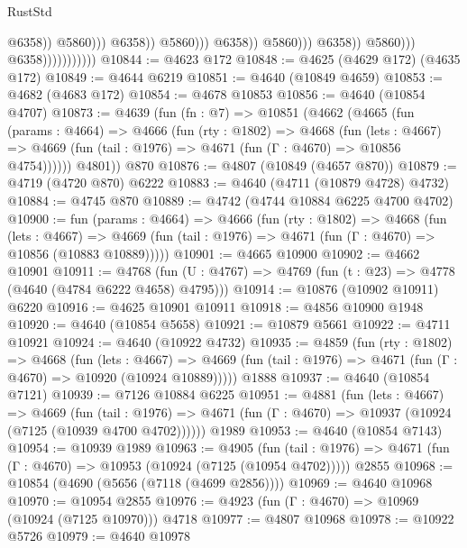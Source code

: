 \begin{lexlean}{RustStd}
\begin{coremodule}
                                                                  @6358))
                                                              @5860)))
                                                        @6358))
                                                    @5860)))
                                              @6358))
                                          @5860)))
                                    @6358))
                                @5860)))
                          @6358)))))))))))
@10844 := @4623 @172
@10848 := @4625 (@4629 @172) (@4635 @172)
@10849 := @4644 @6219
@10851 := @4640 (@10849 @4659)
@10853 := @4682 (@4683 @172)
@10854 := @4678 @10853
@10856 := @4640 (@10854 @4707)
@10873 := @4639
    (fun (fn : @7) =>
    @10851
      (@4662
        (@4665
          (fun (params : @4664) =>
          @4666
            (fun (rty : @1802) =>
            @4668
              (fun (lets : @4667) =>
              @4669 (fun (tail : @1976) => @4671 (fun (Γ : @4670) => @10856 @4754))))))
        @4801))
    @870
@10876 := @4807 (@10849 (@4657 @870))
@10879 := @4719 (@4720 @870) @6222
@10883 := @4640 (@4711 (@10879 @4728) @4732)
@10884 := @4745 @870
@10889 := @4742 (@4744 @10884 @6225 @4700 @4702)
@10900 := fun (params : @4664) =>
  @4666
    (fun (rty : @1802) =>
    @4668
      (fun (lets : @4667) =>
      @4669 (fun (tail : @1976) => @4671 (fun (Γ : @4670) => @10856 (@10883 @10889)))))
@10901 := @4665 @10900
@10902 := @4662 @10901
@10911 := @4768
    (fun (U : @4767) => @4769 (fun (t : @23) => @4778 (@4640 (@4784 @6222 @4658) @4795)))
@10914 := @10876 (@10902 @10911) @6220
@10916 := @4625 @10901 @10911
@10918 := @4856 @10900 @1948
@10920 := @4640 (@10854 @5658)
@10921 := @10879 @5661
@10922 := @4711 @10921
@10924 := @4640 (@10922 @4732)
@10935 := @4859
    (fun (rty : @1802) =>
    @4668
      (fun (lets : @4667) =>
      @4669 (fun (tail : @1976) => @4671 (fun (Γ : @4670) => @10920 (@10924 @10889)))))
    @1888
@10937 := @4640 (@10854 @7121)
@10939 := @7126 @10884 @6225
@10951 := @4881
    (fun (lets : @4667) =>
    @4669
      (fun (tail : @1976) =>
      @4671 (fun (Γ : @4670) => @10937 (@10924 (@7125 (@10939 @4700 @4702))))))
    @1989
@10953 := @4640 (@10854 @7143)
@10954 := @10939 @1989
@10963 := @4905
    (fun (tail : @1976) => @4671 (fun (Γ : @4670) => @10953 (@10924 (@7125 (@10954 @4702)))))
    @2855
@10968 := @10854 (@4690 (@5656 (@7118 (@4699 @2856))))
@10969 := @4640 @10968
@10970 := @10954 @2855
@10976 := @4923 (fun (Γ : @4670) => @10969 (@10924 (@7125 @10970))) @4718
@10977 := @4807 @10968
@10978 := @10922 @5726
@10979 := @4640 @10978

\end{coremodule}
\end{lexlean}

